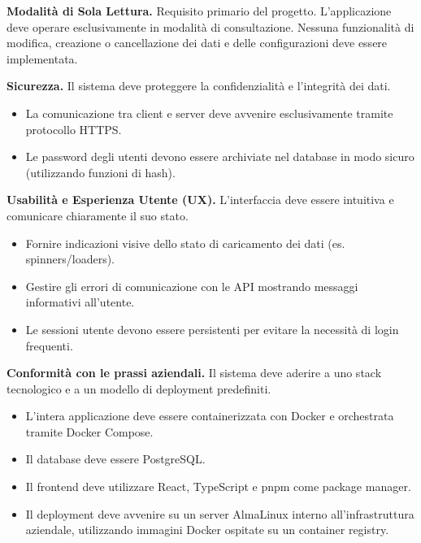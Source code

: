\documentclass[12pt,a4paper,openright,twoside]{book}
\begin{document}
\begin{reqnonfunz}
    \item \label{req:readonly} \textbf{Modalità di Sola Lettura.} Requisito primario del progetto. L'applicazione deve operare esclusivamente in modalità di consultazione. Nessuna funzionalità di modifica, creazione o cancellazione dei dati e delle configurazioni deve essere implementata.

    \item \label{req:security} \textbf{Sicurezza.} Il sistema deve proteggere la confidenzialità e l'integrità dei dati.
    \begin{itemize}
        \item La comunicazione tra client e server deve avvenire esclusivamente tramite protocollo HTTPS.
        \item Le password degli utenti devono essere archiviate nel database in modo sicuro (utilizzando funzioni di hash).
    \end{itemize}

    \item \label{req:ux} \textbf{Usabilità e Esperienza Utente (UX).} L'interfaccia deve essere intuitiva e comunicare chiaramente il suo stato.
    \begin{itemize}
        \item Fornire indicazioni visive dello stato di caricamento dei dati (es. spinners/loaders).
        \item Gestire gli errori di comunicazione con le API mostrando messaggi informativi all'utente.
        \item Le sessioni utente devono essere persistenti per evitare la necessità di login frequenti.
    \end{itemize}


    \item \label{req:comformity} \textbf{Conformità con le prassi aziendali.} Il sistema deve aderire a uno stack tecnologico e a un modello di deployment predefiniti.
    \begin{itemize}
        \item L'intera applicazione deve essere containerizzata con Docker e orchestrata tramite Docker Compose.
        \item Il database deve essere PostgreSQL.
        \item Il frontend deve utilizzare React, TypeScript e pnpm come package manager.
        \item Il deployment deve avvenire su un server AlmaLinux interno all'infrastruttura aziendale, utilizzando immagini Docker ospitate su un container registry.
    \end{itemize}

\end{reqnonfunz}
\end{document}
